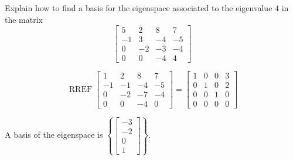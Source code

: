
\begin{exerciseStatement}


Explain how to find a basis for the eigenspace associated to the eigenvalue \( 4 \) in the matrix \[ \left[\begin{array}{cccc}
5 & 2 & 8 & 7 \\
-1 & 3 & -4 & -5 \\
0 & -2 & -3 & -4 \\
0 & 0 & -4 & 4
\end{array}\right] \]


\end{exerciseStatement}
    
\begin{exerciseAnswer} 


\[\operatorname{RREF} \left[\begin{array}{cccc}
1 & 2 & 8 & 7 \\
-1 & -1 & -4 & -5 \\
0 & -2 & -7 & -4 \\
0 & 0 & -4 & 0
\end{array}\right] = \left[\begin{array}{cccc}
1 & 0 & 0 & 3 \\
0 & 1 & 0 & 2 \\
0 & 0 & 1 & 0 \\
0 & 0 & 0 & 0
\end{array}\right] \]



A basis of the eigenspace is \( \left\{ \left[\begin{array}{c}
-3 \\
-2 \\
0 \\
1
\end{array}\right] \right\} \).


\end{exerciseAnswer}
    
